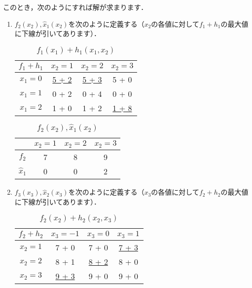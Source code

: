 \documentclass[a5paper]{jarticle}
\begin{document}
このとき，次のようにすれば解が求まります．
\begin{enumerate}
   \item $f_2(x_2), \hat x_1(x_2)$を次のように定義する（$x_2$の各値に対して$f_1 + h_1$の最大値に下線が引いてあります）．
   \begin{table}[H]
   \begin{center}
   \caption{$f_1(x_1) + h_1(x_1, x_2)$}
   \begin{tabular}{|c||c|c|c|} \hline
    $f_1 + h_1$ & $x_2 = 1$ & $x_2 = 2$ & $x_2 = 3$ \\ \hline \hline
    $x_1 = 0$ & \underline{5 + 2} & \underline{5 + 3} & 5 + 0 \\
    $x_1 = 1$ & 0 + 2 & 0 + 4 & 0 + 0 \\
    $x_1 = 2$ & 1 + 0 & 1 + 2 & \underline{1 + 8} \\ \hline
   \end{tabular}
   \end{center}
   \end{table}
   \begin{table}[H]
   \begin{center}
   \caption{$f_2(x_2), \hat x_1(x_2)$}
   \begin{tabular}{|c||c|c|c|} \hline
    & $x_2 = 1$ & $x_2 = 2$ & $x_2 = 3$ \\ \hline \hline
    $f_2$ & 7 & 8 & 9 \\
    $\hat x_1$ & 0 & 0 & 2 \\ \hline
   \end{tabular}
   \label{f2x1}
   \end{center}
   \end{table}
   \item $f_3(x_3), \hat x_2(x_3)$を次のように定義する（$x_3$の各値に対して$f_2 + h_2$の最大値に下線が引いてあります）．
   \begin{table}[H]
   \begin{center}
   \caption{$f_2(x_2) + h_2(x_2, x_3)$}
   \begin{tabular}{|c||c|c|c|} \hline
    $f_2 + h_2$ & $x_3 = -1$ & $x_3 = 0$ & $x_3 = 1$ \\ \hline \hline
    $x_2 = 1$ & 7 + 0 & 7 + 0 & \underline{7 + 3} \\
    $x_2 = 2$ & 8 + 1 & \underline{8 + 2} & 8 + 0 \\
    $x_2 = 3$ & \underline{9 + 3} & 9 + 0 & 9 + 0 \\ \hline
   \end{tabular}
   \end{center}

\end{table}
\end{enumerate}
\end{document}
